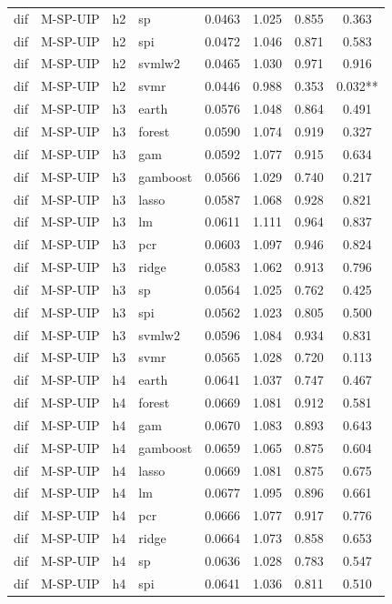 \begin{ThreePartTable}
\begin{longtable}[t]{llclcccc}
dif & M-SP-UIP & h2 & sp & 0.0463 & 1.025 & 0.855 & 0.363\\
dif & M-SP-UIP & h2 & spi & 0.0472 & 1.046 & 0.871 & 0.583\\
dif & M-SP-UIP & h2 & svmlw2 & 0.0465 & 1.030 & 0.971 & 0.916\\
dif & M-SP-UIP & h2 & svmr & 0.0446 & 0.988 & 0.353 & 0.032**\\
\addlinespace
dif & M-SP-UIP & h3 & earth & 0.0576 & 1.048 & 0.864 & 0.491\\
dif & M-SP-UIP & h3 & forest & 0.0590 & 1.074 & 0.919 & 0.327\\
dif & M-SP-UIP & h3 & gam & 0.0592 & 1.077 & 0.915 & 0.634\\
dif & M-SP-UIP & h3 & gamboost & 0.0566 & 1.029 & 0.740 & 0.217\\
dif & M-SP-UIP & h3 & lasso & 0.0587 & 1.068 & 0.928 & 0.821\\
dif & M-SP-UIP & h3 & lm & 0.0611 & 1.111 & 0.964 & 0.837\\
dif & M-SP-UIP & h3 & pcr & 0.0603 & 1.097 & 0.946 & 0.824\\
dif & M-SP-UIP & h3 & ridge & 0.0583 & 1.062 & 0.913 & 0.796\\
dif & M-SP-UIP & h3 & sp & 0.0564 & 1.025 & 0.762 & 0.425\\
dif & M-SP-UIP & h3 & spi & 0.0562 & 1.023 & 0.805 & 0.500\\
dif & M-SP-UIP & h3 & svmlw2 & 0.0596 & 1.084 & 0.934 & 0.831\\
dif & M-SP-UIP & h3 & svmr & 0.0565 & 1.028 & 0.720 & 0.113\\
\addlinespace
dif & M-SP-UIP & h4 & earth & 0.0641 & 1.037 & 0.747 & 0.467\\
dif & M-SP-UIP & h4 & forest & 0.0669 & 1.081 & 0.912 & 0.581\\
dif & M-SP-UIP & h4 & gam & 0.0670 & 1.083 & 0.893 & 0.643\\
dif & M-SP-UIP & h4 & gamboost & 0.0659 & 1.065 & 0.875 & 0.604\\
dif & M-SP-UIP & h4 & lasso & 0.0669 & 1.081 & 0.875 & 0.675\\
dif & M-SP-UIP & h4 & lm & 0.0677 & 1.095 & 0.896 & 0.661\\
dif & M-SP-UIP & h4 & pcr & 0.0666 & 1.077 & 0.917 & 0.776\\
dif & M-SP-UIP & h4 & ridge & 0.0664 & 1.073 & 0.858 & 0.653\\
dif & M-SP-UIP & h4 & sp & 0.0636 & 1.028 & 0.783 & 0.547\\
dif & M-SP-UIP & h4 & spi & 0.0641 & 1.036 & 0.811 & 0.510\\

\end{longtable}
\end{ThreePartTable}
